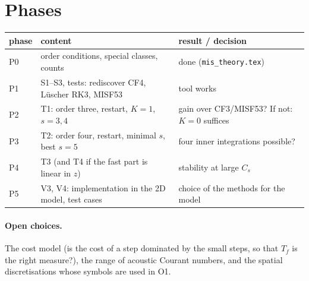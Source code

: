 \documentclass[11pt,a4paper]{article}
\begin{document}
\section{Phases}

\begin{center}
\begin{tabular}{lp{6.6cm}p{6.2cm}}
\toprule
phase & content & result / decision\\\midrule
P0 & order conditions, special classes, counts & done (\texttt{mis\_theory.tex})\\
P1 & S1--S3, tests: rediscover CF4, Lüscher RK3, MISF53 & tool works\\
P2 & T1: order three, restart, $K=1$, $s=3,4$ & gain over CF3/MISF53? If not: $K=0$ suffices\\
P3 & T2: order four, restart, minimal $s$, best $s=5$ & four inner integrations possible?\\
P4 & T3 (and T4 if the fast part is linear in $z$) & stability at large $C_s$\\
P5 & V3, V4: implementation in the 2D model, test cases & choice of the methods for the model\\
\bottomrule
\end{tabular}
\end{center}

\paragraph{Open choices.} The cost model (is the cost of a step dominated by the small steps, so that $T_f$ is the right
measure?), the range of acoustic Courant numbers, and the spatial discretisations whose symbols are used in O1.
\end{document}
